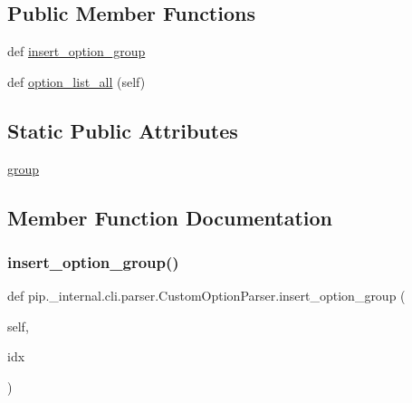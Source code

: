 \subsection*{Public Member Functions}
\begin{DoxyCompactItemize}
\item 
def \hyperlink{classpip_1_1__internal_1_1cli_1_1parser_1_1CustomOptionParser_a1529966215b0858b834eceb2207f73d3}{insert\+\_\+option\+\_\+group}
\item 
def \hyperlink{classpip_1_1__internal_1_1cli_1_1parser_1_1CustomOptionParser_a12d9cccc0f4f5de03ba88fd54881490d}{option\+\_\+list\+\_\+all} (self)
\end{DoxyCompactItemize}
\subsection*{Static Public Attributes}
\begin{DoxyCompactItemize}
\item 
\hyperlink{classpip_1_1__internal_1_1cli_1_1parser_1_1CustomOptionParser_a99d7a33eebe454a1b4d41f73b89d448d}{group}
\end{DoxyCompactItemize}


\subsection{Member Function Documentation}
\mbox{\label{classpip_1_1__internal_1_1cli_1_1parser_1_1CustomOptionParser_a1529966215b0858b834eceb2207f73d3}} 
\subsubsection{\texorpdfstring{insert\+\_\+option\+\_\+group()}{insert\_option\_group()}}
{\footnotesize\ttfamily def pip.\+\_\+internal.\+cli.\+parser.\+Custom\+Option\+Parser.\+insert\+\_\+option\+\_\+group (\begin{DoxyParamCaption}\item[{}]{self,  }\item[{}]{idx }\end{DoxyParamCaption})}


